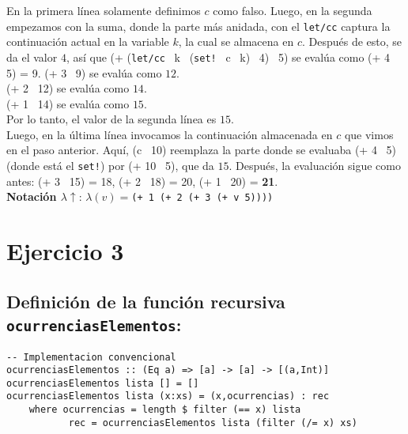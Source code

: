 \documentclass{article}
\begin{document}
En la primera línea solamente definimos $c$ como falso. Luego, en la segunda empezamos con la suma, donde la parte más anidada, con el \texttt{let/cc} captura la continuación actual en la variable $k$, la cual se almacena en $c$. Después de esto, se da el valor $4$, así que (+ (\texttt{let/cc} \, k \, (\texttt{set!} \, c \, k) \, 4) \, 5) se evalúa como  (+ 4 \, 5) = 9.
(+ 3 \, 9) se evalúa como $12$.\\
(+ 2 \, 12) se evalúa como $14$.\\
(+ 1 \, 14) se evalúa como $15$.\\
Por lo tanto, el valor de la segunda línea es $15$.\\
\newline
Luego, en la última línea invocamos la continuación almacenada en $c$ que vimos en el paso anterior. Aquí, (c \, 10)  reemplaza la parte donde se evaluaba (+ 4 \, 5) (donde está el \texttt{set!}) por (+ 10 \, 5), que da $15$. Después, la evaluación sigue como antes:
(+ 3 \, 15) = 18, \quad (+ 2 \, 18) = 20, \quad {} \quad (+ 1 \, 20) = \textbf{21}.\\

\textbf{Notación $\lambda \uparrow$}: $\lambda(v)=$\texttt{(+ 1 (+ 2 (+ 3 (+ v 5))))}\\

\section*{Ejercicio 3}

\subsection*{Definición de la función recursiva \texttt{ocurrenciasElementos}:}

\begin{lstlisting}
-- Implementacion convencional
ocurrenciasElementos :: (Eq a) => [a] -> [a] -> [(a,Int)]
ocurrenciasElementos lista [] = []
ocurrenciasElementos lista (x:xs) = (x,ocurrencias) : rec
    where ocurrencias = length $ filter (== x) lista
           rec = ocurrenciasElementos lista (filter (/= x) xs)
\end{lstlisting}
\end{document}
